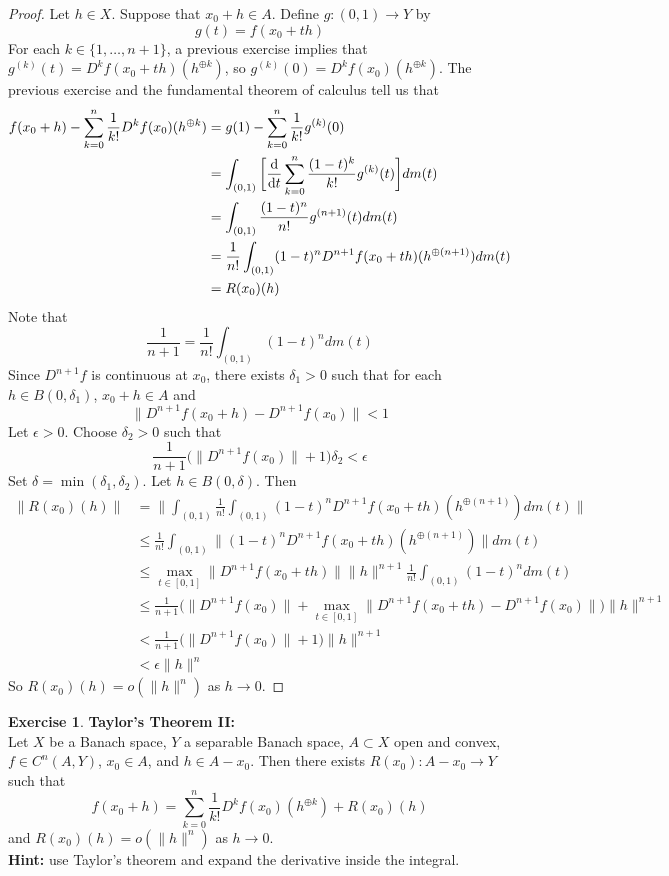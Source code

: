\documentclass[12pt]{amsart}
\theoremstyle{definition}
\newtheorem{ex}[definition]{Exercise}
\newcommand{\del}{\delta}
\newcommand{\ep}{\epsilon}
\newcommand{\tbf}[1]{\textbf{#1}}
\DeclareMathOperator*{\0}{\mbf{0}}
\DeclareMathOperator*{\1}{\mbf{1}}
\newcommand{\lex}[1]{\label{ex:#1}}
\begin{document}
	\begin{proof}
	Let $h \in X$. Suppose that $x_0 + h \in A$. Define $g: (0,1) \rightarrow Y$ by 
	$$g(t) = f(x_0 +t h)$$ 
	For each $k \in \{1, \dots, n+1\}$, a previous exercise implies that $g^{(k)}(t) = D^kf(x_0 + th)(h^{\oplus k})$, so $g^{(k)}(0) = D^kf(x_0)(h^{\oplus k})$. The previous exercise and the fundamental theorem of calculus tell us that 
	\begin{align*}
	f(x_0 +h) - \sum_{k=0}^{n} \frac{1}{k!}D^kf(x_0)(h^{\oplus k})
	&= g(1) - \sum_{k=0}^{n} \frac{1}{k!}g^{(k)}(0)\\
	&= \int_{(0,1)} \bigg [\dv{t} \sum_{k=0}^{n} \frac{(1-t)^k}{k!}g^{(k)}(t)\bigg ] dm(t) \\
	&= \int_{(0,1)} \frac{(1-t)^{n}}{n!}g^{(n+1)}(t) dm(t) \\
	&= \frac{1}{n!}\int_{(0,1)} (1-t)^{n}D^{n+1}f(x_0 + th)(h^{\oplus (n+1)})d m(t) \\
	&= R(x_0)(h)
	\end{align*}	
	Note that $$\frac{1}{n+1} = \frac{1}{n!}\int_{(0,1)} (1-t)^{n} dm(t)$$ 
	Since $D^{n+1}f$ is continuous at $x_0$, there exists $\del_1 >0$ such that for each $h \in B(0, \del_1)$, $x_0 + h \in A$ and 
	$$\|D^{n+1} f(x_0+h) - D^{n+1}f(x_0)\| < 1 $$  
	Let $\ep >0$. Choose $\del_2 >0$ such that $$\frac{1}{n+1} \bigg( \|D^{n+1}f(x_0 )\|  +  1 \bigg) \del_2 < \ep$$ Set $\del = \min(\del_1, \del_2)$. Let $h \in B(0, \del)$. Then
	\begin{align*}
	\|R(x_0)(h)\| 
	&= \bigg \| \int_{(0,1)} \frac{1}{n!}\int_{(0,1)} (1-t)^{n}D^{n+1}f(x_0 + th)(h^{\oplus (n+1)})d m(t) \bigg\| \\
	&\leq \frac{1}{n!}\int_{(0,1)} \|(1-t)^{n}D^{n+1}f(x_0 + th)(h^{\oplus (n+1)}) \|dm(t)\\
	&\leq \max_{t \in [0,1]}\|D^{n+1}f(x_0 + th)\| \|h\|^{n+1} \frac{1}{n!}\int_{(0,1)} (1-t)^{n} dm(t)  \\
	&\leq \frac{1}{n+1}  \bigg(\|D^{n+1}f(x_0 )\| +  \max_{t \in [0,1]} \|D^{n+1} f(x_0+th) - D^{n+1}f(x_0)\| \bigg)\|h\|^{n+1}  \\
	&< \frac{1}{n+1}\bigg(\|D^{n+1}f(x_0 )\|  +  1 \bigg)\|h\|^{n+1}  \\
	&<\ep \|h\|^n
	\end{align*}
	So $R(x_0)(h) = o(\|h\|^{n})$ as $h \rightarrow 0$.
	\end{proof}
	
	
	\begin{ex} \lex{} \tbf{Taylor's Theorem II:}\\
	Let $X$ be a Banach space, $Y$ a separable Banach space, $A \subset X$ open and convex, $f\in C^{n}(A, Y)$, $x_0 \in A$, and $h \in A - x_0$. Then there exists $R(x_0): A - x_0 \rightarrow Y$ such that $$f(x_0 + h) = \sum_{k=0}^{n} \frac{1}{k!} D^k f(x_0)(h^{\oplus k}) + R(x_0)(h)$$ and $R(x_0)(h) = o(\|h\|^n)$ as $ h \rightarrow 0$. \\
	\tbf{Hint:} use Taylor's theorem and expand the derivative inside the integral.
	\end{ex}
	
\end{document}
